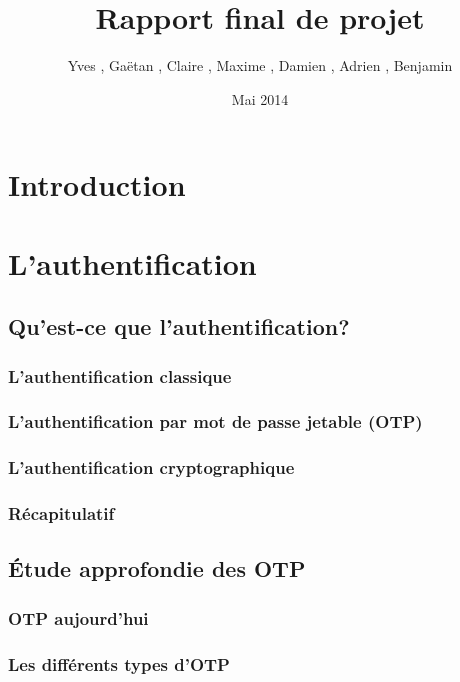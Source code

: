 \documentclass{"../../res/univ-projet-rapport"}
\title{Rapport final de projet}
\author{Yves \bsc{Adegoloye}, Gaëtan \bsc{Ferry}, Claire \bsc{Hardouin}, Maxime \bsc{Michotte}, Damien \bsc{Picard}, Adrien \bsc{Smondack}, Benjamin \bsc{Zigh}}
\date{Mai 2014}
\begin{document}
\maketitle
\tableofcontents
\newpage

\chapter{Introduction}



\chapter{L'authentification}

\section{Qu'est-ce que l'authentification?}

\subsection{L'authentification classique}

\subsection{L'authentification par mot de passe jetable (OTP)}

\subsection{L'authentification cryptographique}

\subsection{Récapitulatif}


\section{Étude approfondie des OTP}

\subsection{OTP aujourd'hui}

\subsection{Les différents types d'OTP}
\end{document}
